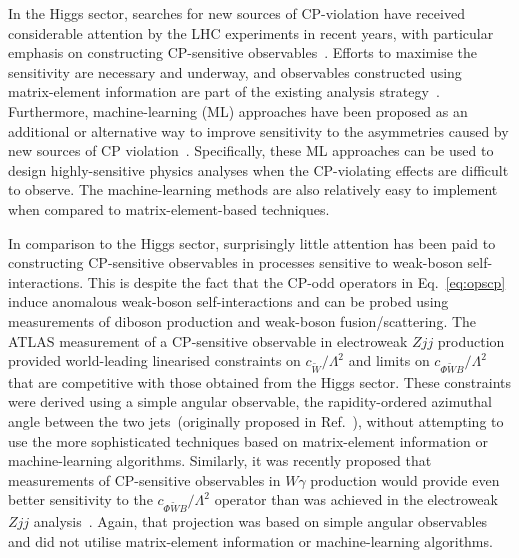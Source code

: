 \documentclass[twocolumn,preprintnumbers,superscriptaddress,nofootinbib,aps,prd,floatfix]{revtex4}
\begin{document}
In the Higgs sector, searches for new sources of CP-violation have received considerable attention by the LHC experiments in recent years, with particular emphasis on constructing CP-sensitive observables~\cite{ATLAS:2018hxb,ATLAS:2020wny,ATLAS:2021pkb,CMS:2021sdq,ATLAS:2016ifi,CMS:2019jdw,ATLAS:2020evk,CMS:2021nnc}.
Efforts to maximise the sensitivity are necessary and underway, and observables constructed using matrix-element information are part of the existing analysis strategy~\cite{ATLAS:2016ifi,CMS:2019jdw,ATLAS:2020evk,CMS:2021nnc}. Furthermore, machine-learning (ML) approaches have been proposed as an additional or alternative way to improve sensitivity to the asymmetries caused by new sources of CP violation~\cite{Brehmer:2017lrt,Gritsan:2020pib,Bortolato:2020zcg,Barman:2021yfh,Davis:2021tiv,Bhardwaj:2021ujv}. Specifically, these ML approaches can be used to design highly-sensitive physics analyses when the CP-violating effects are difficult to observe. The machine-learning methods are also relatively easy to implement when compared to matrix-element-based techniques.

In comparison to the Higgs sector, surprisingly little attention has been paid to constructing CP-sensitive observables in processes sensitive to weak-boson self-interactions. This is despite the fact that the CP-odd operators in Eq.~\eqref{eq:opscp} induce anomalous weak-boson self-interactions and can be probed using measurements of diboson production and weak-boson fusion/scattering. The ATLAS measurement of a CP-sensitive observable in electroweak $Zjj$ production~\cite{ATLAS:2020nzk} provided world-leading linearised constraints on $c_{\widetilde{W}}/\Lambda^2$ and limits on $c_{\Phi\widetilde{W}B}/\Lambda^2$ that are competitive with those obtained from the Higgs sector. These constraints were derived using a simple angular observable, the rapidity-ordered azimuthal angle between the two jets~(originally proposed in Ref.~\cite{Plehn:2001nj}), without attempting to use the more sophisticated techniques based on matrix-element information or machine-learning algorithms. Similarly, it was recently proposed that measurements of CP-sensitive observables in $W\gamma$ production would provide even better sensitivity to the $c_{\Phi\widetilde{W}B}/\Lambda^2$ operator than was achieved in the electroweak $Zjj$ analysis~\cite{DasBakshi:2020ejz,Biekotter:2021int}. Again, that projection was based on simple angular observables and did not utilise matrix-element information or machine-learning algorithms. 
\end{document}
